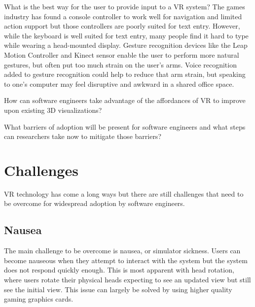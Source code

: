 \documentclass[conference]{IEEEtran}
\begin{document}

What is the best way for the user to provide input to a VR system? 
The games industry has found a console controller to work well for navigation and limited action support but those controllers are poorly suited for text entry. 
However, while the keyboard is well suited for text entry, many people find it hard to type while wearing a head-mounted display. 
Gesture recognition devices like the Leap Motion Controller and Kinect sensor enable the user to perform more natural gestures, but often put too much strain on the user's arms. 
Voice recognition added to gesture recognition could help to reduce that arm strain, but speaking to one's computer may feel disruptive and awkward in a shared office space.

How can software engineers take advantage of the affordances of VR to improve upon existing 3D visualizations?

What barriers of adoption will be present for software engineers and what steps can researchers take now to mitigate those barriers?

\section{Challenges}
VR technology has come a long ways but there are still challenges that need to be overcome for widespread adoption by software engineers.

\subsection{Nausea}
The main challenge to be overcome is nausea, or simulator sickness.
Users can become nauseous when they attempt to interact with the system but the system does not respond quickly enough.
This is most apparent with head rotation, where users rotate their physical heads expecting to see an updated view but still see the initial view.
This issue can largely be solved by using higher quality gaming graphics cards.
\end{document}
